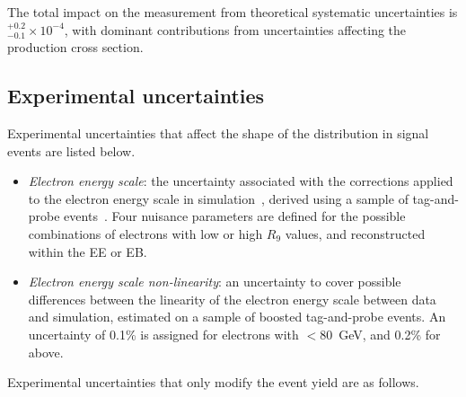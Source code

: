 \noindent The total impact on the \BHee measurement from theoretical systematic uncertainties is ${}^{+0.2}_{-0.1} \times 10^{-4}$, with dominant contributions from uncertainties affecting the \ggH production cross section.

\subsection{Experimental uncertainties}

Experimental uncertainties that affect the shape of the \mee distribution in signal events are listed below.
   
\begin{itemize}
\item \textit{Electron energy scale}:
  the uncertainty associated with the corrections applied to the electron energy scale in simulation~\cite{CMS_egamma_performance}, derived using a sample of \Zee tag-and-probe events~\cite{TagAndProbe}. Four nuisance parameters are defined for the possible combinations of electrons with low or high $R_{9}$ values, and reconstructed within the EE or EB. %
\item \textit{Electron energy scale non-linearity}:
  an uncertainty to cover possible differences between the linearity of the electron energy scale between data and simulation, estimated on a sample of boosted tag-and-probe events. An uncertainty of 0.1\% is assigned for electrons with \pt$<80$~GeV, and 0.2\% for above.
\end{itemize}
   
\noindent Experimental uncertainties that only modify the event yield are as follows.

